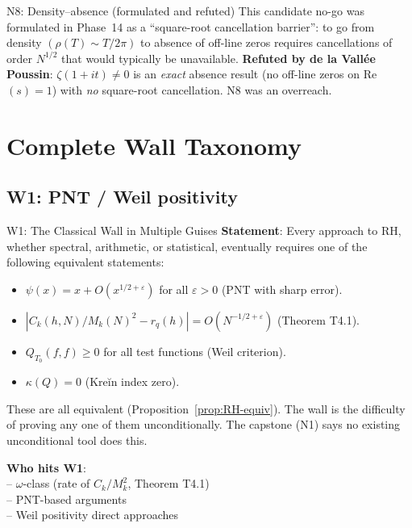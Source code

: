 \documentclass[11pt]{amsart}
\theoremstyle{definition}
\theoremstyle{remark}
\newcommand{\om}{\omega}
\newcommand{\kap}{\kappa}
\newcommand{\eps}{\varepsilon}
\begin{document}
\begin{nogobox}{N8: Density--absence (formulated and refuted)}
This candidate no-go was formulated in Phase~14 as a ``square-root cancellation barrier'':
to go from density $(\rho(T)\sim T/2\pi)$ to absence of off-line zeros requires
cancellations of order $N^{1/2}$ that would typically be unavailable.
\textbf{Refuted by de la Vallée Poussin}: $\zeta(1+it)\ne 0$ is an \emph{exact}
absence result (no off-line zeros on Re$(s)=1$) with \emph{no} square-root cancellation.
N8 was an overreach.
\end{nogobox}

\section{Complete Wall Taxonomy}
\label{sec:walls}

\subsection{W1: PNT / Weil positivity}

\begin{wallbox}{W1: The Classical Wall in Multiple Guises}
\textbf{Statement}: Every approach to RH, whether spectral, arithmetic, or statistical,
eventually requires one of the following equivalent statements:
\begin{itemize}
  \item $\psi(x) = x + O(x^{1/2+\eps})$ for all $\eps>0$ (PNT with sharp error).
  \item $|C_k(h,N)/M_k(N)^2 - r_q(h)| = O(N^{-1/2+\eps})$ (Theorem T4.1).
  \item $Q_{T_0}(f,f)\ge 0$ for all test functions (Weil criterion).
  \item $\kap(Q)=0$ (Kreĭn index zero).
\end{itemize}
These are all equivalent (Proposition~\ref{prop:RH-equiv}).  The wall is the
difficulty of proving any one of them unconditionally.  The capstone (N1) says
no existing unconditional tool does this.

\textbf{Who hits W1}: \\
-- $\om$-class (rate of $C_k/M_k^2$, Theorem T4.1) \\
-- PNT-based arguments \\
-- Weil positivity direct approaches
\end{wallbox}
\end{document}
